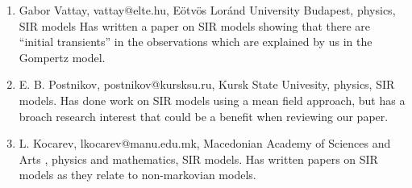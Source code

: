 \documentclass[11pt,a4paper,roman]{moderncv}
\begin{document}
\begin{enumerate}
\item Gabor Vattay, vattay@elte.hu, Eötvös Loránd University Budapest, physics, SIR models
Has written a paper on SIR models showing that there are ``initial transients'' in the observations which are explained by us in the Gompertz model.
\item E. B. Postnikov, postnikov@kursksu.ru, Kursk State Univesity, physics, SIR models.
Has done work on SIR models using a mean field approach, but has a broach research interest that could be a benefit when reviewing our paper.
\item L. Kocarev, lkocarev@manu.edu.mk, Macedonian Academy of Sciences and Arts
, physics and mathematics, SIR models.
Has written papers on SIR models as they relate to non-markovian models.




\end{enumerate} 
\end{document}
